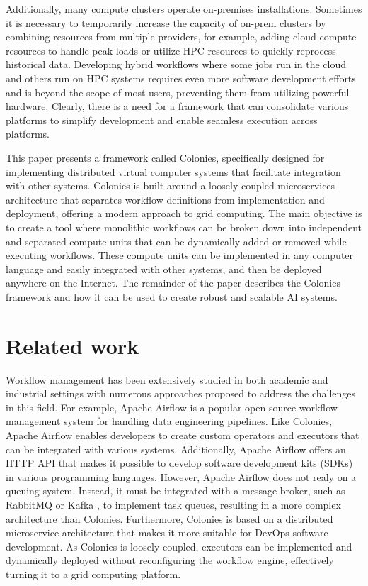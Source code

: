\documentclass{article}
\begin{document}
Additionally, many compute clusters operate on-premises installations. Sometimes it is necessary to temporarily increase the capacity of on-prem clusters by combining resources from multiple providers, for example, adding cloud compute resources to handle peak loads or utilize HPC resources to quickly reprocess historical data. Developing hybrid workflows where some jobs run in the cloud and others run on HPC systems requires even more software development efforts and is beyond the scope of most users, preventing them from utilizing powerful hardware. Clearly, there is a need for a framework that can consolidate various platforms to simplify development and enable seamless execution across platforms.

This paper presents a framework called Colonies, specifically designed for implementing distributed virtual computer systems that facilitate integration with other systems. Colonies is built around a loosely-coupled microservices architecture that separates workflow definitions from implementation and deployment, offering a modern approach to grid computing. The main objective is to create a tool where monolithic workflows can be broken down into independent and separated compute units that can be dynamically added or removed while executing workflows. These compute units can be implemented in any computer language and easily integrated with other systems, and then be deployed anywhere on the Internet. The remainder of the paper describes the Colonies framework and how it can be used to create robust and scalable AI systems. 

\section{Related work}
Workflow management has been extensively studied in both academic and industrial settings with numerous approaches proposed to address the challenges in this field. For example, Apache Airflow \cite{apache_airflow} is a popular open-source workflow management system for handling data engineering pipelines. Like Colonies, Apache Airflow enables developers to create custom operators and executors that can be integrated with various systems. Additionally, Apache Airflow offers an HTTP API that makes it possible to develop software development kits (SDKs) in various programming languages. However, Apache Airflow does not realy on a queuing system. Instead, it must be integrated with a message broker, such as RabbitMQ \cite{rabbitmq} or Kafka \cite{apache_kafka}, to implement task queues, resulting in a more complex architecture than Colonies. Furthermore, Colonies is based on a distributed microservice architecture that makes it more suitable for DevOps software development. As Colonies is loosely coupled, executors can be implemented and dynamically deployed without reconfiguring the workflow engine, effectively turning it to a grid computing platform. 
\end{document}
